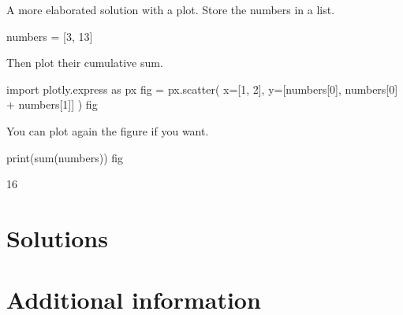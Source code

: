 \documentclass{book}
\begin{document}
\begin{additionalinformation}
A more elaborated solution with a plot. Store the numbers in a list.

\begin{pycell}
numbers = [3, 13]
\end{pycell}

Then plot their cumulative sum.

\begin{pycell}
import plotly.express as px
fig = px.scatter(
    x=[1, 2],
    y=[numbers[0], numbers[0] + numbers[1]]
)
fig
\end{pycell}

\newpage

You can plot again the figure if you want.

\begin{pycell}
print(sum(numbers))
fig
\end{pycell}
\begin{pyexpectedoutput}
16
\end{pyexpectedoutput}
\end{additionalinformation}

\chapter{Solutions}

\chapter{Additional information}
\end{document}
